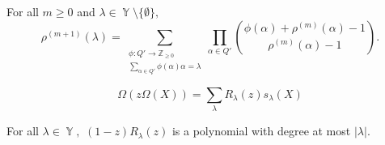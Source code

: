 \documentclass[10pt,a4paper]{amsart}
\DeclareMathOperator{\Par}{\mathbb{Y}}
\begin{document}
\begin{prop}\label{monomial recursion prop} For all $m \geq 0$ and $\lambda \in \Par \setminus \{ \emptyset \},$
    $$\rho^{(m+1)}(\lambda) = \sum_{\substack{\phi:Q'\rightarrow \mathbb{Z}_{\geq 0} \\ \sum_{\alpha \in Q'} \phi(\alpha)\alpha = \lambda}} \prod_{\alpha \in Q'} \binom{\phi(\alpha) + \rho^{(m)}(\alpha)-1}{\rho^{(m)}(\alpha)-1}.$$
\end{prop}

\begin{lem}\label{restriction lemma}
    $$\Omega\left(z \Omega(X) \right) = \sum_{\lambda} R_{\lambda}(z) s_{\lambda}(X)$$
\end{lem}

\begin{prop}
    For all $\lambda \in \Par,$
     $(1-z)R_{\lambda}(z)$ is a polynomial with degree at most $|\lambda|$. 
\end{prop}
\end{document}
